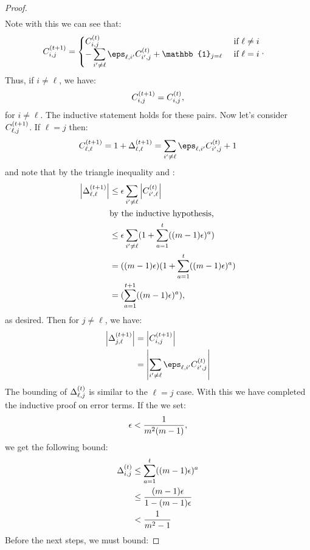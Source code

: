 \begin{proof}
\begin{align*}
    \end{align*}
    Note with this we can see that:
    \begin{align*}
    \errs{i}{j}{\timestep+1}
    &= \begin{cases}
         \errs{i}{j}{\timestep} &\text{ if } \ell \neq i \\
         -\displaystyle\sum_{i'\neq \ell} \error{\ell}{i'}\errs{i'}{j}{\timestep} + \mathbb{1}_{j=\ell}  &\text{ if } \ell = i
    \end{cases}.
    \end{align*}
Thus, if $i\neq \ell$, we have:
\[C_{i,j}^{(t+1)}=C_{i,j}^{(t)},\]
for $i\neq\ell$.
The inductive statement holds for these pairs.
Now let's consider $C_{\ell,j}^{(t+1)}$. If $\ell = j $ then:
\[\errs{\ell}{\ell}{t+1}= 1+ \Delta_{\ell,\ell}^{(\timestep+1)}= \sum_{i'\neq \ell} \error{\ell}{i'}\errs{i'}{j}{\timestep}+1\]
and note that by the triangle inequality and :
\begin{align*}\left|\Delta_{\ell,\ell}^{(t+1)}\right| &\le \epsilon \sum_{i'\neq \ell}\left|C_{i',\ell}^{(t)}\right| \\
&\text{by the inductive hypothesis,} \\
&\le \epsilon\sum_{i'\neq \ell}(1+\sum_{a=1}^{t}((m-1)\epsilon)^{a})\\
&= ((m-1)\epsilon)(1+\sum_{a=1}^{t}((m-1)\epsilon)^{a}) \\
&= (\sum_{a=1}^{t+1}((m-1)\epsilon)^{a}),
\end{align*}
as desired.
Then for $j\neq \ell$, we have:
\begin{align*} \left|\Delta^{(\timestep+1)}_{j,\ell}\right| &=\left|\errs{i}{j}{t+1}\right|\\ &= \left|\sum_{i'\neq\ell} \error{\ell}{i'}\errs{i'}{j}{\timestep}\right|
\end{align*}
The bounding of $\Delta_{\ell, j}^{(t)}$ is similar to the $\ell=j$ case.
With this we have completed the inductive proof on error terms.
If the we set:
\[\epsilon < \frac{1}{m^{2}(m-1)}, \]
we get the following bound:
\begin{align} \Delta_{i,j}^{(t)}&\le \sum_{a=1}^{t}((m-1)\epsilon)^{a}  \\ &\le \frac{(m-1)\epsilon}{1-(m-1)\epsilon} \\
&<\frac{1}{m^{2}-1} \label{eq:delta-bound}
\end{align}
Before the next steps, we must bound:

\end{proof}
